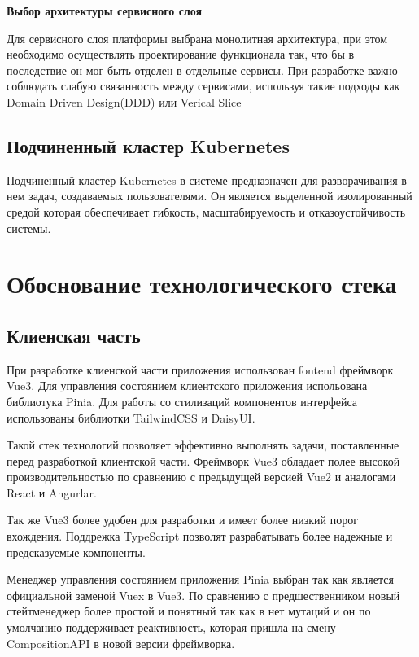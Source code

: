 {\bf Выбор архитектуры сервисного слоя}

Для сервисного слоя платформы выбрана  монолитная архитектура, при этом необходимо осуществлять проектирование функционала так, что бы в последствие он мог быть отделен в отдельные сервисы. При разработке важно соблюдать слабую связанность\cite{valipour2009brief} между сервисами, используя такие подходы как Domain Driven Design(DDD) \cite{evans2004domain} или Verical Slice\cite{ratner2011vertical}

\subsection{Подчиненный кластер Kubernetes}

Подчиненный кластер Kubernetes в системе предназначен для разворачивания в нем задач, создаваемых пользователями. Он является выделенной изолированный средой которая обеспечивает гибкость, масштабируемость и отказоустойчивость системы.

\section{Обоснование технологического стека}

\subsection{Клиенская часть}

При разработке клиенской части приложения использован fontend фреймворк Vue3.
Для управления состоянием клиентского приложения испольована библиотука Pinia.
Для работы со стилизаций компонентов интерфейса использованы библиотки TailwindCSS и DaisyUI.

Такой стек технологий позволяет эффективно выполнять задачи, поставленные перед разработкой клиентской части.
Фреймворк Vue3 обладает полее высокой производительностью по сравнению с предыдущей версией Vue2 и аналогами React и Angurlar.

Так же Vue3 более удобен для разработки и имеет более низкий порог вхождения. Поддрежка TypeScript позволят разрабатывать более надежные и предсказуемые компоненты.

Менеджер управления состоянием приложения Pinia выбран так как является официальной заменой Vuex в Vue3. По сравнению с предшественником новый стейтменеджер более простой и понятный так как в нет мутаций и он по умолчанию поддерживает реактивность, которая пришла на смену CompositionAPI в новой версии фреймворка.


